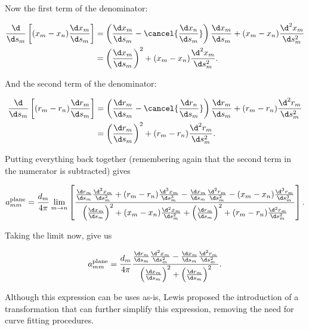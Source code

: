 Now the first term of the denominator:

\begin{equation}
	\begin{aligned}
		\frac{\d}{\d s_m} \left[(x_m-x_n)\frac{\d x_m}{\d s_m}\right] &= \left(\frac{\d x_m}{\d s_m} - \cancel{\frac{\d x_n}{\d s_m}}\right)\frac{\d x_m}{\d s_m}+(x_m-x_n)\frac{\d^2 x_m}{\d s_m^2}\\
		&= \left(\frac{\d x_m}{\d s_m}\right)^2+(x_m-x_n)\frac{\d^2 x_m}{\d s_m^2}.
	\end{aligned}
\end{equation}

\noindent And the second term of the denominator:

\begin{equation}
	\begin{aligned}
		\frac{\d}{\d s_m} \left[(r_m-r_n)\frac{\d r_m}{\d s_m}\right] &= \left(\frac{\d r_m}{\d s_m} - \cancel{\frac{\d r_n}{\d s_m}}\right)\frac{\d r_m}{\d s_m}+(r_m-r_n)\frac{\d^2 r_m}{\d s_m^2}\\
		&= \left(\frac{\d r_m}{\d s_m}\right)^2+(r_m-r_n)\frac{\d^2 r_m}{\d s_m^2}.
	\end{aligned}
\end{equation}

\noindent Putting everything back together (remembering again that the second term in the numerator is subtracted) gives

\begin{equation}
	a^\text{plane}_{mm} = \frac{d_m}{4 \pi} \lim_{m\rightarrow n} \left[\frac{\frac{\d r_m}{\d s_m} \frac{\d^2 x_m}{\d s_m^2}+(r_m-r_n)\frac{\d^3 x_m}{\d s_m^3}-\frac{\d x_m}{\d s_m} \frac{\d^2 r_m}{\d s_m^2}-(x_m-x_n)\frac{\d^3 r_m}{\d s_m^3}}{\left(\frac{\d x_m}{\d s_m}\right)^2+(x_m-x_n)\frac{\d^2 x_m}{\d s_m^2}+\left(\frac{\d r_m}{\d s_m}\right)^2+(r_m-r_n)\frac{\d^2 r_m}{\d s_m^2}}\right].
\end{equation}

Taking the limit now, give us

\begin{equation}
	\label{eqn:planarselfinduced1}
	a^\text{plane}_{mm} = \frac{d_m}{4 \pi} \frac{\frac{\d r_m}{\d s_m} \frac{\d^2 x_m}{\d s_m^2}-\frac{\d x_m}{\d s_m} \frac{\d^2 r_m}{\d s_m^2}}{\left(\frac{\d x_m}{\d s_m}\right)^2+\left(\frac{\d r_m}{\d s_m}\right)^2}.
\end{equation}


Although this expression can be uses as-is, Lewis \cite{Lewis_1991} proposed the introduction of a transformation that can further simplify this expression, removing the need for curve fitting procedures.

